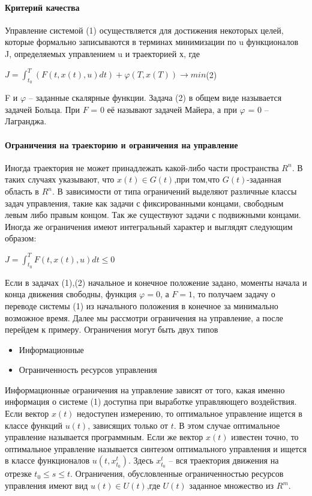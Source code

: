 \documentclass[12pt]{article}
\begin{document}
\paragraph{Критерий качества}
\normalsize{Управление системой (1) осуществляется для достижения некоторых целей, которые формально записываются в терминах минимизации по u функционалов J, определяемых управлением u и траекторией х, где
	\begin{flushright}
		$J= \int_{t_0}^{T}(F(t,x(t),u)dt)+ \varphi (T,x(T)) \rightarrow min$\hspace{4cm}(2)
	\end{flushright} 
F и $\varphi$ – заданные скалярные функции. Задача (2) в общем виде называется задачей Больца. При $F$ = 0 её называют задачей Майера, а при $\varphi$ = 0 – Лагранджа.}
\paragraph{Ограничения на траекторию и ограничения на управление}
\normalsize{Иногда траектория не может принадлежать какой-либо части пространства $R^n$. В таких случаях указывают, что $x(t) \in G(t)$,при том,что $G(t)$-заданная область в $R^n$. В зависимости от типа ограничений выделяют различные классы задач управления, такие как задачи с фиксированными концами, свободным левым либо правым концом. Так же существуют задачи с подвижными концами. Иногда же ограничения имеют интегральный характер и выглядят следующим образом:
	\begin{center}
		$J = \int_{t_0}^{T} F(t,x(t),u)dt \le 0$
	\end{center}
}
\normalsize{Если в задачах (1),(2) начальное и конечное положение задано, моменты начала и конца движения свободны, функция $\varphi = 0$, а $F = 1$, то получаем задачу о переводе системы (1) из начального положения в конечное за минимально возможное время.
Далее мы рассмотри ограничения на управление, а после перейдем к примеру.
Ограничения могут быть двух типов
	\begin{itemize}
		\item Информационные
		\item Ограниченность ресурсов управления
	\end{itemize}
Информационные ограничения на управление зависят от того, какая именно информация о системе (1) доступна при выработке управляющего воздействия. Если вектор $x(t)$ недоступен измерению, то оптимальное управление ищется в классе функций $u(t)$, зависящих только от $t$. В этом случае оптимальное управление называется программным. Если же вектор $x(t)$ известен точно, то оптимальное управление называется синтезом оптимального управления и ищется в классе функционалов $u(t,x_{t_0}^{t}).$ Здесь $x_{t_0}^{t}$ – вся траектория движения на отрезке $t_0 \le s \le t$.
Ограничения, обусловленные ограниченностью ресурсов управления имеют вид $u(t) \in U(t)$,где $U(t)$  заданное множество из $R^m$.
}
\end{document}
